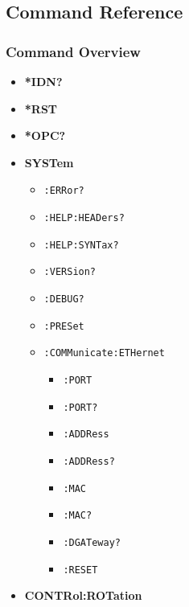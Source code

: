 \newpage

\subsection{Command Reference} \label{sec:command_reference}

\subsubsection{Command Overview}


\begin{itemize}[label={}]
    \item \textbf{*IDN?}
    \vspace{-0.25em}
    \item \textbf{*RST}
    \vspace{-0.25em}
    \item \textbf{*OPC?}
    \vspace{-0.25em}
    \item \textbf{SYSTem}
    \vspace{-0.25em}
    \begin{itemize}[label={}]
        \item \texttt{:ERRor?}
        \item \texttt{:HELP:HEADers?}
        \item \texttt{:HELP:SYNTax?}
        \item \texttt{:VERSion?}
        \item \texttt{:DEBUG?}
        \item \texttt{:PRESet}
        \item \texttt{:COMMunicate:ETHernet}
        \begin{itemize}[label={}]
            \item \texttt{:PORT}
            \item \texttt{:PORT?}
            \item \texttt{:ADDRess}
            \item \texttt{:ADDRess?}
            \item \texttt{:MAC}
            \item \texttt{:MAC?}
            \item \texttt{:DGATeway?}
            \item \texttt{:RESET}
        \end{itemize}
    \end{itemize}
    \vspace{-0.25em}
    \item \textbf{CONTRol:ROTation}

\end{itemize}
